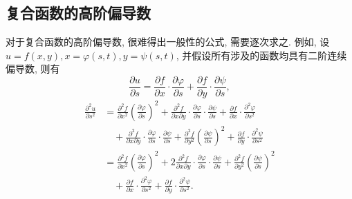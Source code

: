 \documentclass[12pt,fontset=fandol]{ctexart}
\begin{document}
\subsection{复合函数的高阶偏导数}

对于复合函数的高阶偏导数, 很难得出一般性的公式, 需要逐次求之. 例如, 设 $u=f(x,y),x=\varphi(s,t),y=\psi(s,t)$, 并假设所有涉及的函数均具有二阶连续偏导数, 则有
\[
  \frac{\partial u}{\partial s}
  =\frac{\partial f}{\partial x}\cdot\frac{\partial\varphi}{\partial s}
  +\frac{\partial f}{\partial y}\cdot\frac{\partial\psi}{\partial s},
\]
\[
\begin{aligned}
  \frac{\partial^2u}{\partial s^2}
  &=\frac{\partial^2 f}{\partial x^2}\left(\frac{\partial\varphi}{\partial s}\right)^2
  +\frac{\partial^2 f}{\partial x\partial y}\cdot
  \frac{\partial\varphi}{\partial s}\cdot\frac{\partial\psi}{\partial s}
  +\frac{\partial f}{\partial x}\cdot\frac{\partial^2\varphi}{\partial s^2}\\
  &\quad+\frac{\partial^2 f}{\partial x\partial y}\cdot
  \frac{\partial\varphi}{\partial s}\cdot\frac{\partial\psi}{\partial s}
  +\frac{\partial^2 f}{\partial y^2}\left(\frac{\partial\psi}{\partial s}\right)^2
  +\frac{\partial f}{\partial y}\cdot\frac{\partial^2\psi}{\partial s^2}\\
  &=\frac{\partial^2 f}{\partial x^2}\left(\frac{\partial\varphi}{\partial s}\right)^2
  +2\frac{\partial^2 f}{\partial x\partial y}\cdot
  \frac{\partial\varphi}{\partial s}\cdot\frac{\partial\psi}{\partial s}
  +\frac{\partial^2 f}{\partial y^2}\left(\frac{\partial\psi}{\partial s}\right)^2\\
  &\quad+\frac{\partial f}{\partial x}\cdot\frac{\partial^2\varphi}{\partial s^2}
  +\frac{\partial f}{\partial y}\cdot\frac{\partial^2\psi}{\partial s^2}.
\end{aligned}
\]
\end{document}
